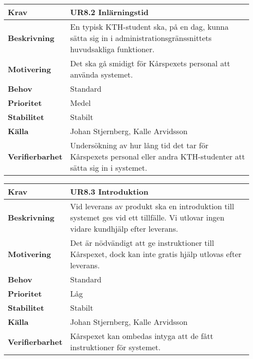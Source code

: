 \documentclass[a4paper, twoside, 11pt, titlepage]{article}
\begin{document}
		\begin{tabular} { p{2.6cm} p{12.5cm} }
			\hline
			\sffamily\textbf{Krav} & \sffamily\textbf{UR8.2 Inlärningstid } \\
			\hline
			\sffamily\textbf{Beskrivning} & En typisk KTH-student ska, på en dag, kunna sätta sig in i administrationsgränssnittets huvudsakliga funktioner.  \\
			\hline
			\sffamily\textbf{Motivering} & Det ska gå smidigt för Kårspexets personal att använda systemet.  \\
			\hline
			\sffamily\textbf{Behov} & Standard  \\
			\hline
			\sffamily\textbf{Prioritet} & Medel  \\
			\hline
			\sffamily\textbf{Stabilitet} & Stabilt  \\
			\hline
			\sffamily\textbf{Källa} & Johan Stjernberg, Kalle Arvidsson  \\
			\hline
			\sffamily\textbf{Verifierbarhet} & Undersökning av hur lång tid det tar för Kårspexets personal eller andra KTH-studenter att sätta sig in i systemet.  \\
			\hline
		\end{tabular}
		\vspace{6mm}

		\begin{tabular} { p{2.6cm} p{12.5cm} }
			\hline
			\sffamily\textbf{Krav} & \sffamily\textbf{UR8.3 Introduktion } \\
			\hline
			\sffamily\textbf{Beskrivning} & Vid leverans av produkt ska en introduktion till systemet ges vid ett tillfälle. Vi utlovar ingen vidare kundhjälp efter leverans.  \\
			\hline
			\sffamily\textbf{Motivering} & Det är nödvändigt att ge instruktioner till Kårspexet, dock kan inte gratis hjälp utlovas efter leverans.  \\
			\hline
			\sffamily\textbf{Behov} & Standard  \\
			\hline
			\sffamily\textbf{Prioritet} & Låg  \\
			\hline
			\sffamily\textbf{Stabilitet} & Stabilt  \\
			\hline
			\sffamily\textbf{Källa} & Johan Stjernberg, Kalle Arvidsson  \\
			\hline
			\sffamily\textbf{Verifierbarhet} & Kårspexet kan ombedas intyga att de fått instruktioner för systemet.  \\
			\hline
		\end{tabular}
		\vspace{6mm}
\end{document}
